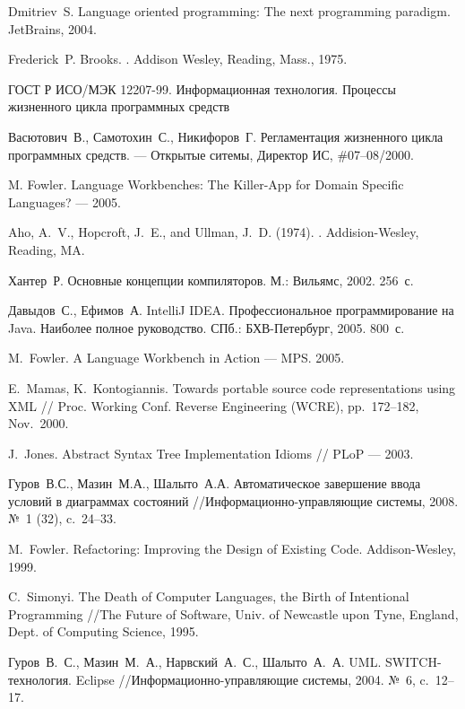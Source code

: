 \documentclass[a4paper,10pt]{article}
\begin{document}
\begin{thebibliography}{99}
Dmitriev~S. Language oriented programming: The next programming paradigm. JetBrains, 2004.

Frederick~P. Brooks.
.
\newblock Addison Wesley, Reading, Mass., 1975.

ГОСТ Р ИСО/МЭК 12207-99. Информационная технология. Процессы жизненного цикла программных средств

Васютович~В., Самотохин~С., Никифоров~Г.
Регламентация жизненного цикла программных средств.
--- Открытые ситемы, Директор ИС, \#07--08/2000.

M. Fowler. Language Workbenches: The Killer-App for Domain Specific Languages? --- 2005.

Aho, A.~V., Hopcroft, J.~E., and Ullman, J.~D. (1974).
.
\newblock Addision-Wesley, Reading, MA.

Хантер~Р. Основные концепции компиляторов. М.: Вильямс, 2002. 256~с.

Давыдов~С., Ефимов~А. IntelliJ IDEA.
Профессиональное программирование на Java. Наиболее полное руководство.
СПб.: БХВ-Петербург, 2005. 800~с.

M.~Fowler.
A Language Workbench in Action --- MPS.
2005.

E.~Mamas, K.~Kontogiannis.
Towards portable source code representations using XML
// Proc. Working Conf. Reverse Engineering (WCRE), pp.~172--182, Nov.~2000.

J.~Jones.
Abstract Syntax Tree Implementation Idioms
// PLoP --- 2003.

Гуров~В.С., Мазин~М.А., Шалыто~А.А.
Автоматическое завершение ввода условий в диаграммах состояний
//Информационно-управляющие системы, 2008. №~1 (32), c.~24--33.

M.~Fowler.
Refactoring: Improving the Design of Existing Code.
Addison-Wesley, 1999.

C.~Simonyi.
The Death of Computer Languages, the Birth of Intentional Programming
//The Future of Software, Univ. of Newcastle upon Tyne, England, Dept. of Computing Science, 1995.

Гуров~В.~С., Мазин~М.~А., Нарвский~А.~С., Шалыто~А.~А.
UML. SWITCH-технология. Eclipse
//Информационно-управляющие системы, 2004. №~6, c.~12--17.


\end{thebibliography}
\end{document}
